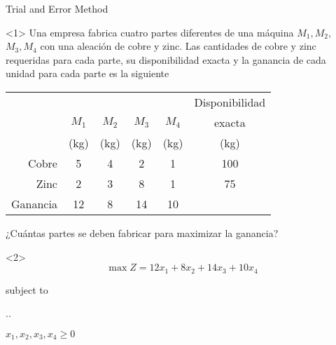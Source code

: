 \begin{frameExample}{Trial and Error Method \label{example:02.15-03}}{}
  \begin{onlyenv}<1>
      Una empresa fabrica cuatro partes diferentes de una máquina $M_1, M_2,$ $ M_3, M_4$ con una aleación de cobre y zinc. Las cantidades de cobre y zinc requeridas para cada parte, su \alert{disponibilidad exacta} y la ganancia de cada unidad para cada parte es la siguiente

  {\centering
    \begin{tabular}{rccccc}
      \toprule
      &&&&&Disponibilidad\\
      &$M_1$&$M_2$&$M_3$&$M_4$&exacta\\
      &(kg)&(kg)&(kg)&(kg)&(kg)\\
      \midrule
      Cobre&5&4&2&1&100\\
      Zinc&2&3&8&1&75\\
      Ganancia&12&8&14&10&\\
      \bottomrule
    \end{tabular}
  \par}

¿Cuántas partes se deben fabricar para maximizar la ganancia?
\end{onlyenv}
\begin{onlyenv}<2>
  \[ \max Z = 12x_1 + 8x_2 + 14x_3 + 10x_4\]

  {
    \centering
    subject to

    \sysdelim..%

    \vspace{4mm}
    $x_1, x_2,x_3, x_4 \geq 0$
    \par
  }
\end{onlyenv}
\end{frameExample}

